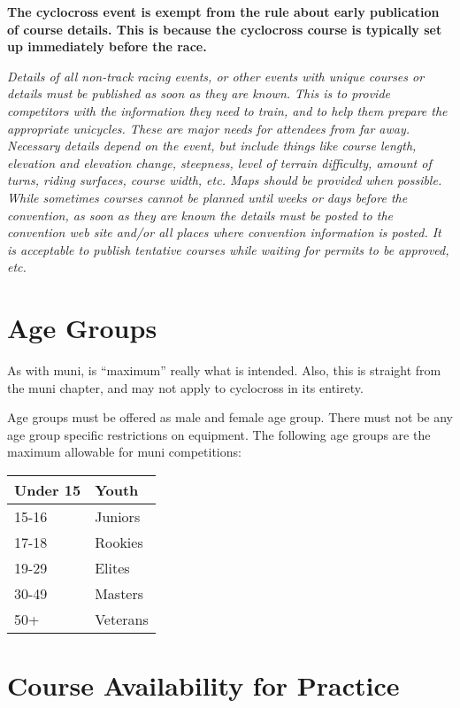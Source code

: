 \textbf{The cyclocross event is exempt from the rule about early publication of course details. This is because the cyclocross course is typically set up immediately before the race.}

\textit{Details of all non-track racing events, or other events with unique courses or details must be published as soon as they are known. 
This is to provide competitors with the information they need to train, and to help them prepare the appropriate unicycles.
These are major needs for attendees from far away. 
Necessary details depend on the event, but include things like course length, elevation and elevation change, steepness, level of terrain difficulty, amount of turns, riding surfaces, course width, etc.
Maps should be provided when possible. 
While sometimes courses cannot be planned until weeks or days before the convention, as soon as they are known the details must be posted to the convention web site and/or all places where convention information is posted. 
It is acceptable to publish tentative courses while waiting for permits to be approved, etc.}

\section{Age Groups}

\begin{framed}
As with muni, is ``maximum'' really what is intended.  Also, this is straight from the muni chapter, and may not apply to cyclocross in its entirety.
\end{framed}

Age groups must be offered as male and female age group.
There must not be any age group specific restrictions on equipment.
The following age groups are the maximum allowable for muni competitions:

\begin{tabular}{|l|l|}
\hline
Under 15 & Youth \\
\hline
15-16 & Juniors \\
\hline
17-18 & Rookies \\
\hline
19-29 & Elites \\
\hline
30-49 & Masters \\
\hline
50+ & Veterans \\
\hline
\end{tabular}

\section{Course Availability for Practice}

